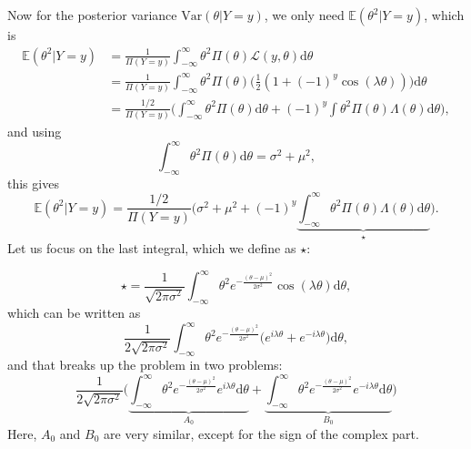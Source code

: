 \documentclass[]{report}
\begin{document}
Now for the posterior variance $\text{Var}(\theta|Y=y)$, we only need $\mathbb{E}(\theta^2 | Y=y)$, which is
\begin{align}
   \mathbb{E}(\theta^2 | Y=y) &= \frac{1}{\Pi(Y=y)} \int_{-\infty}^{\infty} \theta^2 \Pi(\theta)\mathcal{L}(y, \theta)\text{d}\theta\\
   &= \frac{1}{\Pi(Y=y)} \int_{-\infty}^{\infty} \theta^2 \Pi(\theta)\Big(\frac{1}{2}(1 + (-1)^{y} \cos(\lambda \theta))\Big)\text{d}\theta\\
   &= \frac{1/2}{\Pi(Y=y)} \Bigg(\int_{-\infty}^{\infty}\theta^2\Pi(\theta)\text{d}\theta + (-1)^y \int\theta^2\Pi(\theta)\Lambda(\theta)\text{d}\theta\Bigg),
\end{align}
and using
\begin{equation}
   \int_{-\infty}^{\infty}\theta^2\Pi(\theta)\text{d}\theta = \sigma^2 + \mu^2,
\end{equation}
this gives
\begin{equation}
\label{eq:second-moment}
    \mathbb{E}(\theta^2 | Y=y) = \frac{1/2}{\Pi(Y=y)} \Bigg(\sigma^2 + \mu^2+ (-1)^y \underbrace{\int_{-\infty}^{\infty}\theta^2\Pi(\theta)\Lambda(\theta)\text{d}\theta}_{\star}\Bigg).
\end{equation}
Let us focus on the last integral, which we define as $\star$:

\begin{equation}
    \star = \frac{1}{\sqrt{2\pi \sigma^2}}\int_{-\infty}^{\infty}\theta^2e^{-\frac{(\theta-\mu)^2}{2\sigma^2}}\cos(\lambda\theta)\text{d}\theta,
\end{equation}
which can be written as
\begin{equation}
    \frac{1}{2\sqrt{2\pi \sigma^2}}\int_{-\infty}^{\infty}\theta^2e^{-\frac{(\theta-\mu)^2}{2\sigma^2}} \Big( e^{i\lambda\theta} + e^{-i\lambda\theta} \Big) \text{d}\theta,
\end{equation}
and that breaks up the problem in two problems:
\begin{equation}
    \frac{1}{2\sqrt{2\pi \sigma^2}} \Big(
        \underbrace{\int_{-\infty}^{\infty}\theta^2e^{-\frac{(\theta-\mu)^2}{2\sigma^2}} e^{i\lambda\theta}\text{d}\theta}_{A_0} +
        \underbrace{\int_{-\infty}^{\infty}\theta^2e^{-\frac{(\theta-\mu)^2}{2\sigma^2}}e^{-i\lambda\theta}\text{d}\theta}_{B_0}
    \Big)
\end{equation}
Here, $A_0$ and $B_0$ are very similar, except for the sign of the complex part.
\end{document}
